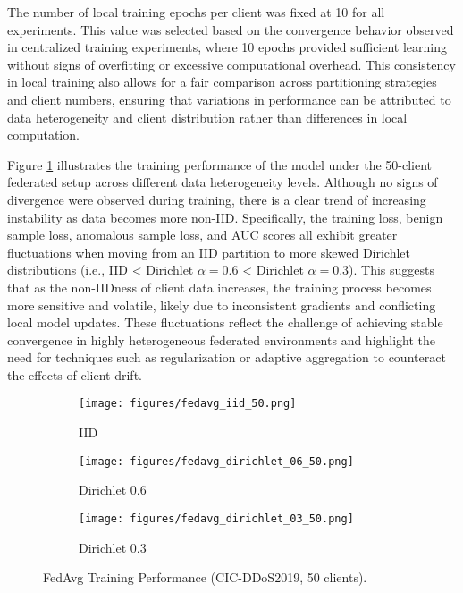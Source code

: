The number of local training epochs per client was fixed at 10 for all experiments. This value was selected based on the convergence behavior observed in centralized training experiments, where 10 epochs provided sufficient learning without signs of overfitting or excessive computational overhead. This consistency in local training also allows for a fair comparison across partitioning strategies and client numbers, ensuring that variations in performance can be attributed to data heterogeneity and client distribution rather than differences in local computation.

Figure \ref{fig:fedavg_performance} illustrates the training performance of the model under the 50-client federated setup across different data heterogeneity levels. Although no signs of divergence were observed during training, there is a clear trend of increasing instability as data becomes more non-IID. Specifically, the training loss, benign sample loss, anomalous sample loss, and AUC scores all exhibit greater fluctuations when moving from an IID partition to more skewed Dirichlet distributions (i.e., IID < Dirichlet $\alpha=0.6$ < Dirichlet $\alpha=0.3$). This suggests that as the non-IIDness of client data increases, the training process becomes more sensitive and volatile, likely due to inconsistent gradients and conflicting local model updates. These fluctuations reflect the challenge of achieving stable convergence in highly heterogeneous federated environments and highlight the need for techniques such as regularization or adaptive aggregation to counteract the effects of client drift.

\begin{figure}[h]
    \centering

    \begin{subfigure}[b]{0.32\textwidth}
        \centering
        \texttt{[image: figures/fedavg\_iid\_50.png]}
        \caption{IID}
    \end{subfigure}
    \hfill
    \begin{subfigure}[b]{0.32\textwidth}
        \centering
        \texttt{[image: figures/fedavg\_dirichlet\_06\_50.png]}
        \caption{Dirichlet 0.6}
    \end{subfigure}
    \hfill
    \begin{subfigure}[b]{0.32\textwidth}
        \centering
        \texttt{[image: figures/fedavg\_dirichlet\_03\_50.png]}
        \caption{Dirichlet 0.3}
    \end{subfigure}

    \caption{FedAvg Training Performance (CIC-DDoS2019, 50 clients).}
    \label{fig:fedavg_performance}
\end{figure}

